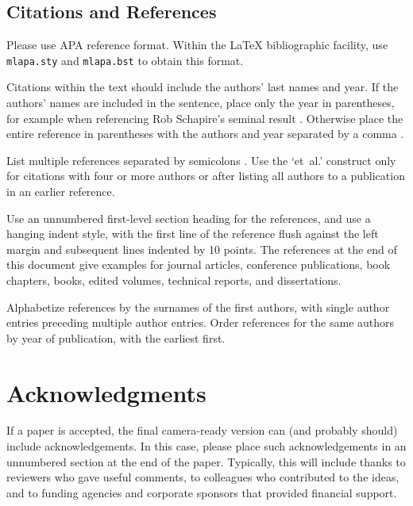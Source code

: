 \documentclass{article}
\begin{document}
\subsection{Citations and References}
Please use APA reference format. Within the \LaTeX\/ bibliographic facility, use {\tt mlapa.sty} and {\tt mlapa.bst} to obtain this format.

Citations within the text should include the authors' last names and year. If the authors' names are included in the sentence, place only the year in parentheses, for example when referencing Rob Schapire's seminal result . Otherwise place the entire reference in parentheses with the authors and year separated by a comma \cite{schapire90}.

List multiple references separated by semicolons \cite{kearns89,schapire90,neal93}. Use the `et~al.' construct only for citations with four or more authors or after listing all authors to a publication in an earlier reference.

Use an unnumbered first-level section heading for the references, and use a hanging indent style, with the first line of the reference flush against the left margin and subsequent lines indented by 10 points. The references at the end of this document give examples for journal articles, conference publications, book chapters, books, edited volumes,
technical reports, and dissertations.

Alphabetize references by the surnames of the first authors, with single author entries preceding multiple author entries. Order references for the same authors by year of publication, with the earliest first.

\section*{Acknowledgments}
If a paper is accepted, the final camera-ready version can (and
probably should) include acknowledgements. In this case, please place such acknowledgements in an unnumbered section at the end of the paper. Typically, this will include thanks to reviewers who gave useful comments, to colleagues who contributed to the ideas, and to funding agencies and corporate sponsors that provided financial support.

\nocite{zinkevich03}



\end{document}
